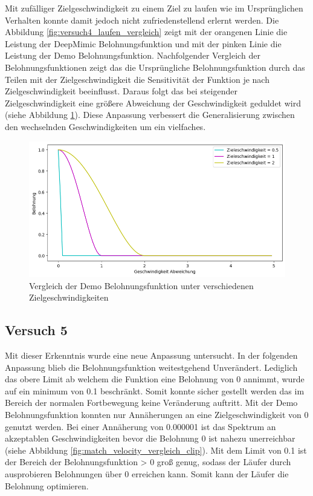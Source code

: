 Mit zufälliger Zielgeschwindigkeit zu einem Ziel zu laufen wie im Ursprünglichen Verhalten konnte damit jedoch nicht zufriedenstellend erlernt werden. Die Abbildung \ref{fig:versuch4_laufen_vergleich} zeigt mit der orangenen Linie die Leistung der DeepMimic Belohnungsfunktion und mit der pinken Linie die Leistung der Demo Belohnungsfunktion. Nachfolgender Vergleich der Belohnungsfunktionen zeigt das die Ursprüngliche Belohnungsfunktion durch das Teilen mit der Zielgeschwindigkeit die Sensitivität der Funktion je nach Zielgeschwindigkeit beeinflusst. Daraus folgt das bei steigender Zielgeschwindigkeit eine größere Abweichung der Geschwindigkeit geduldet wird (siehe Abbildung \ref{fig:match_velocity_demo_vergleich}). Diese Anpassung verbessert die Generalisierung zwischen den wechselnden Geschwindigkeiten um ein vielfaches.

\begin{figure}[H]
  \centering  
  \includegraphics[scale=0.5]{img/match_velocity_demo_vergleich.png}
  \caption{Vergleich der Demo Belohnungsfunktion unter verschiedenen Zielgeschwindigkeiten}
  \label{fig:match_velocity_demo_vergleich}
\end{figure}

\subsection{Versuch 5}
Mit dieser Erkenntnis wurde eine neue Anpassung untersucht. In der folgenden Anpassung blieb die Belohnungsfunktion weitestgehend Unverändert. Lediglich das obere Limit ab welchem die Funktion eine Belohnung von 0 annimmt, wurde auf ein minimum von 0.1 beschränkt. Somit konnte sicher gestellt werden das im Bereich der normalen Fortbewegung keine Veränderung auftritt. Mit der Demo Belohnungsfunktion konnten nur Annäherungen an eine Zielgeschwindigkeit von 0 genutzt werden. Bei einer Annäherung von 0.000001 ist das Spektrum an akzeptablen Geschwindigkeiten bevor die Belohnung 0 ist nahezu unerreichbar (siehe Abbildung \ref{fig:match_velocity_vergleich_clip}). Mit dem Limit von 0.1 ist der Bereich der Belohnungsfunktion > 0 groß genug, sodass der Läufer durch ausprobieren Belohnungen über 0 erreichen kann. Somit kann der Läufer die Belohnung optimieren.\\

